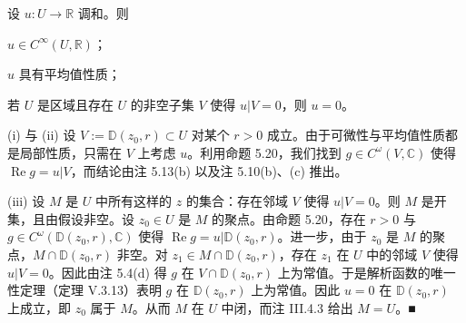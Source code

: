 \begin{corollary}

设 $ u : U \to \mathbb{R} $ 调和。则

\begin{subitems}
\item

$ u \in C^{\infty}(U,\mathbb{R}) $；

\item

$ u $ 具有平均值性质；

\item

若 $ U $ 是区域且存在 $ U $ 的非空子集 $ V $ 使得 $ u|V = 0 $，则 $ u = 0 $。

\proofhead
(i) 与 (ii) 设 $ V := \mathbb{D}(z_{0},r) \subset U $ 对某个 $ r > 0 $ 成立。由于可微性与平均值性质都是局部性质，只需在 $ V $ 上考虑 $ u $。利用命题 5.20，我们找到 $ g \in C^{\omega}(V,\mathbb{C}) $ 使得 $ \operatorname{Re} g = u|V $，而结论由注 5.13(b) 以及注 5.10(b)、(c) 推出。
\end{subitems}

(iii) 设 $ M $ 是 $ U $ 中所有这样的 $ z $ 的集合：存在邻域 $ V $ 使得 $ u|V = 0 $。则 $ M $ 是开集，且由假设非空。设 $ z_{0} \in U $ 是 $ M $ 的聚点。由命题 5.20，存在 $ r > 0 $ 与 $ g \in C^{\omega}\left(\mathbb{D}(z_{0},r),\mathbb{C}\right) $ 使得 $ \operatorname{Re} g = u|\mathbb{D}(z_{0},r) $。进一步，由于 $ z_{0} $ 是 $ M $ 的聚点，$ M\cap\mathbb{D}(z_{0},r) $ 非空。对 $ z_{1} \in M\cap\mathbb{D}(z_{0},r) $，存在 $ z_{1} $ 在 $ U $ 中的邻域 $ V $ 使得 $ u|V = 0 $。因此由注 5.4(d) 得 $ g $ 在 $ V\cap\mathbb{D}(z_{0},r) $ 上为常值。于是解析函数的唯一性定理（定理 V.3.13）表明 $ g $ 在 $ \mathbb{D}(z_{0},r) $ 上为常值。因此 $ u = 0 $ 在 $ \mathbb{D}(z_{0},r) $ 上成立，即 $ z_{0} $ 属于 $ M $。从而 $ M $ 在 $ U $ 中闭，而注 III.4.3 给出 $ M = U $。\nobreak\hspace{0.35em}■

\end{corollary}

